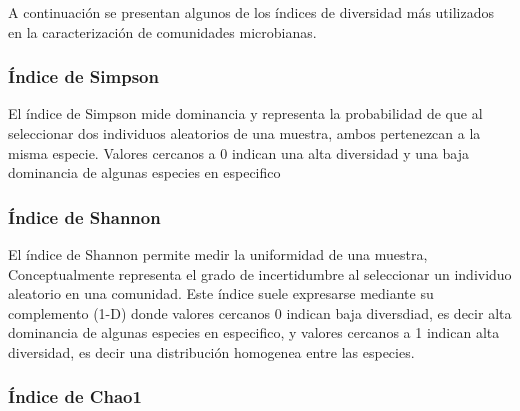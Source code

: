 A continuación se presentan algunos de los índices de diversidad más utilizados en la caracterización de comunidades microbianas.   
\subsubsection{Índice de Simpson}
El índice de Simpson mide dominancia y representa la probabilidad de que al seleccionar dos individuos aleatorios de una muestra, ambos pertenezcan a la misma especie. Valores cercanos a 0 indican una alta diversidad y una baja dominancia de algunas especies en especifico

\subsubsection{Índice de Shannon}
El índice de Shannon permite medir la uniformidad de una muestra, Conceptualmente representa el grado de incertidumbre al seleccionar un individuo aleatorio en una comunidad. Este índice suele expresarse mediante su complemento (1-D) donde valores cercanos 0 indican baja diversdiad, es decir alta dominancia de algunas especies en especifico, y valores cercanos a 1 indican alta diversidad, es decir una distribución homogenea entre las especies.

\subsubsection{Índice de Chao1}
